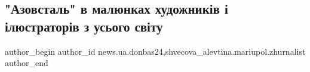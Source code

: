  
 
 
 
 
 
\subsection{"Азовсталь" в малюнках художників і ілюстраторів з усього світу}
\label{sec:13_08_2022.stz.news.ua.donbas24.2.azovstal_v_maljunkah_hudozhnykiv_z_usjogo_svity}
 
\ifcmt
 author_begin
   author_id news.ua.donbas24,shvecova_alevtina.mariupol.zhurnalist
 author_end
\fi
